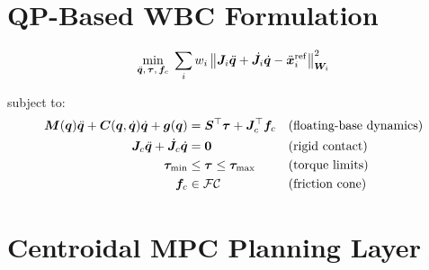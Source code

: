 \lipsum[17]

\section{QP-Based WBC Formulation}
\label{sec:qp-wbc}


\begin{equation}
  \min_{\ddot{\bm{q}},\, \bm{\tau},\, \bm{f}_c} \;
    \sum_{i} w_i \left\lVert\bm{J}_i \ddot{\bm{q}} + \dot{\bm{J}}_i \dot{\bm{q}} - \ddot{\bm{x}}_i^{\mathrm{ref}}\right\rVert_{\bm{W}_i}^2
  \label{eq:qp-cost}
\end{equation}

\noindent subject to:
\begin{align}
  \bm{M}(\bm{q})\ddot{\bm{q}} + \bm{C}(\bm{q},\dot{\bm{q}})\dot{\bm{q}} + \bm{g}(\bm{q}) &= \bm{S}^{\top}\bm{\tau} + \bm{J}_c^{\top}\bm{f}_c
    & &\text{(floating-base dynamics)} \label{eq:qp-dyn} \\
  \bm{J}_c\ddot{\bm{q}} + \dot{\bm{J}_c}\dot{\bm{q}} &= \bm{0}
    & &\text{(rigid contact)} \label{eq:qp-contact} \\
  \bm{\tau}_{\min} &\leq \bm{\tau} \leq \bm{\tau}_{\max}
    & &\text{(torque limits)} \label{eq:qp-torque} \\
  \bm{f}_c &\in \mathcal{FC}
    & &\text{(friction cone)} \label{eq:qp-friction}
\end{align}


\lipsum[18]

\begin{criticalinsight}
\end{criticalinsight}

\section{Centroidal MPC Planning Layer}
\label{sec:mpc-planning}


\lipsum[19]

